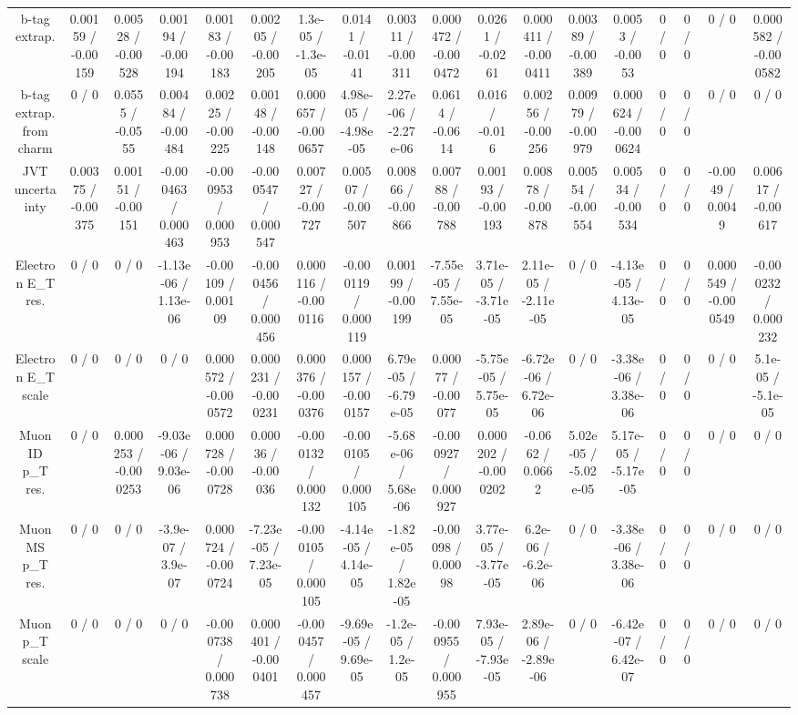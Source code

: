 \documentclass[10pt]{article}
\begin{document}
\begin{table}[htbp]
\begin{center}
\begin{tabular}{|c|c|c|c|c|c|c|c|c|c|c|c|c|c|c|c|c|c|}
  b-tag extrap. & 0.00159 / -0.00159 & 0.00528 / -0.00528 & 0.00194 / -0.00194 & 0.00183 / -0.00183 & 0.00205 / -0.00205 & 1.3e-05 / -1.3e-05 & 0.0141 / -0.0141 & 0.00311 / -0.00311 & 0.000472 / -0.000472 & 0.0261 / -0.0261 & 0.000411 / -0.000411 & 0.00389 / -0.00389 & 0.0053 / -0.0053 & 0 / 0 & 0 / 0 & 0 / 0 & 0.000582 / -0.000582 \\ 
  b-tag extrap. from charm & 0 / 0 & 0.0555 / -0.0555 & 0.00484 / -0.00484 & 0.00225 / -0.00225 & 0.00148 / -0.00148 & 0.000657 / -0.000657 & 4.98e-05 / -4.98e-05 & 2.27e-06 / -2.27e-06 & 0.0614 / -0.0614 & 0.016 / -0.016 & 0.00256 / -0.00256 & 0.00979 / -0.00979 & 0.000624 / -0.000624 & 0 / 0 & 0 / 0 & 0 / 0 & 0 / 0 \\ 
  JVT uncertainty & 0.00375 / -0.00375 & 0.00151 / -0.00151 & -0.000463 / 0.000463 & -0.000953 / 0.000953 & -0.000547 / 0.000547 & 0.00727 / -0.00727 & 0.00507 / -0.00507 & 0.00866 / -0.00866 & 0.00788 / -0.00788 & 0.00193 / -0.00193 & 0.00878 / -0.00878 & 0.00554 / -0.00554 & 0.00534 / -0.00534 & 0 / 0 & 0 / 0 & -0.0049 / 0.0049 & 0.00617 / -0.00617 \\ 
  Electron E_{T} res. & 0 / 0 & 0 / 0 & -1.13e-06 / 1.13e-06 & -0.00109 / 0.00109 & -0.000456 / 0.000456 & 0.000116 / -0.000116 & -0.000119 / 0.000119 & 0.00199 / -0.00199 & -7.55e-05 / 7.55e-05 & 3.71e-05 / -3.71e-05 & 2.11e-05 / -2.11e-05 & 0 / 0 & -4.13e-05 / 4.13e-05 & 0 / 0 & 0 / 0 & 0.000549 / -0.000549 & -0.000232 / 0.000232 \\ 
  Electron E_{T} scale & 0 / 0 & 0 / 0 & 0 / 0 & 0.000572 / -0.000572 & 0.000231 / -0.000231 & 0.000376 / -0.000376 & 0.000157 / -0.000157 & 6.79e-05 / -6.79e-05 & 0.00077 / -0.00077 & -5.75e-05 / 5.75e-05 & -6.72e-06 / 6.72e-06 & 0 / 0 & -3.38e-06 / 3.38e-06 & 0 / 0 & 0 / 0 & 0 / 0 & 5.1e-05 / -5.1e-05 \\ 
  Muon ID p_{T} res. & 0 / 0 & 0.000253 / -0.000253 & -9.03e-06 / 9.03e-06 & 0.000728 / -0.000728 & 0.00036 / -0.00036 & -0.000132 / 0.000132 & -0.000105 / 0.000105 & -5.68e-06 / 5.68e-06 & -0.000927 / 0.000927 & 0.000202 / -0.000202 & -0.0662 / 0.0662 & 5.02e-05 / -5.02e-05 & 5.17e-05 / -5.17e-05 & 0 / 0 & 0 / 0 & 0 / 0 & 0 / 0 \\ 
  Muon MS p_{T} res. & 0 / 0 & 0 / 0 & -3.9e-07 / 3.9e-07 & 0.000724 / -0.000724 & -7.23e-05 / 7.23e-05 & -0.000105 / 0.000105 & -4.14e-05 / 4.14e-05 & -1.82e-05 / 1.82e-05 & -0.00098 / 0.00098 & 3.77e-05 / -3.77e-05 & 6.2e-06 / -6.2e-06 & 0 / 0 & -3.38e-06 / 3.38e-06 & 0 / 0 & 0 / 0 & 0 / 0 & 0 / 0 \\ 
  Muon p_{T} scale & 0 / 0 & 0 / 0 & 0 / 0 & -0.000738 / 0.000738 & 0.000401 / -0.000401 & -0.000457 / 0.000457 & -9.69e-05 / 9.69e-05 & -1.2e-05 / 1.2e-05 & -0.000955 / 0.000955 & 7.93e-05 / -7.93e-05 & 2.89e-06 / -2.89e-06 & 0 / 0 & -6.42e-07 / 6.42e-07 & 0 / 0 & 0 / 0 & 0 / 0 & 0 / 0 \\ 

\end{tabular}
\end{center}
\end{table}
\end{document}
